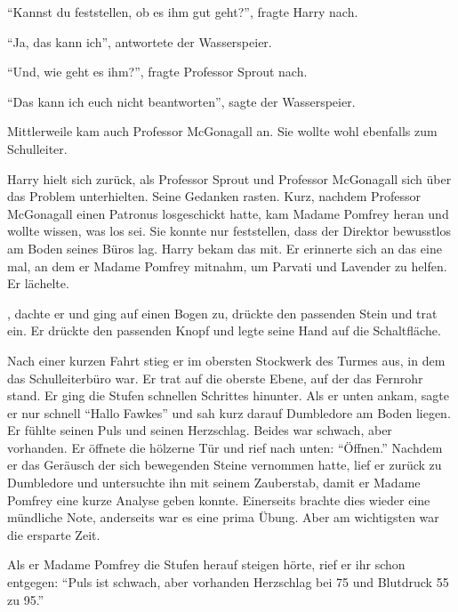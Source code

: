 \enquote{Kannst du feststellen, ob es ihm gut geht?}, fragte Harry nach.

\enquote{Ja, das kann ich}, antwortete der Wasserspeier.

\enquote{Und, wie geht es ihm?}, fragte Professor Sprout nach.

\enquote{Das kann ich euch nicht beantworten}, sagte der Wasserspeier.

Mittlerweile kam auch Professor McGonagall an. Sie wollte wohl ebenfalls zum Schulleiter.

Harry hielt sich zurück, als Professor Sprout und Professor McGonagall sich über das Problem unterhielten. Seine Gedanken rasten. Kurz, nachdem Professor McGonagall einen Patronus losgeschickt hatte, kam Madame Pomfrey heran und wollte wissen, was los sei. Sie konnte nur feststellen, dass der Direktor bewusstlos am Boden seines Büros lag. Harry bekam das mit. Er erinnerte sich an das eine mal, an dem er Madame Pomfrey mitnahm, um Parvati und Lavender zu helfen. Er lächelte.

, dachte er und ging auf einen Bogen zu, drückte den passenden Stein und trat ein. Er drückte den passenden Knopf und legte seine Hand auf die Schaltfläche.

Nach einer kurzen Fahrt stieg er im obersten Stockwerk des Turmes aus, in dem das Schulleiterbüro war. Er trat auf die oberste Ebene, auf der das Fernrohr stand. Er ging die Stufen schnellen Schrittes hinunter. Als er unten ankam, sagte er nur schnell \enquote{Hallo Fawkes} und sah kurz darauf Dumbledore am Boden liegen. Er fühlte seinen Puls und seinen Herzschlag. Beides war schwach, aber vorhanden. Er öffnete die hölzerne Tür und rief nach unten: \enquote{Öffnen.} Nachdem er das Geräusch der sich bewegenden Steine vernommen hatte, lief er zurück zu Dumbledore und untersuchte ihn mit seinem Zauberstab, damit er Madame Pomfrey eine kurze Analyse geben konnte. Einerseits brachte dies wieder eine mündliche Note, anderseits war es eine prima Übung. Aber am wichtigsten war die ersparte Zeit.

Als er Madame Pomfrey die Stufen herauf steigen hörte, rief er ihr schon entgegen: \enquote{Puls ist schwach, aber vorhanden Herzschlag bei 75 und Blutdruck 55 zu 95.}

